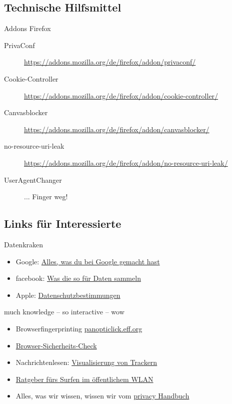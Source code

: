 \documentclass[hyperref={colorlinks,linkcolor=blue}, utf8]{beamer}
\begin{document}
	\subsection{Technische Hilfsmittel}
	\begin{frame}{Addons Firefox}
		\noindent
		\begin{description}
			\item[PrivaConf] \url{https://addons.mozilla.org/de/firefox/addon/privaconf/}
			\item[Cookie-Controller] \url{https://addons.mozilla.org/de/firefox/addon/cookie-controller/}
			\item[Canvasblocker] \url{https://addons.mozilla.org/de/firefox/addon/canvasblocker/}
			\item[no-resource-uri-leak] \url{https://addons.mozilla.org/de/firefox/addon/no-resource-uri-leak/}
			\item[UserAgentChanger]{... Finger weg!}
		\end{description}
	\end{frame}
	
	\subsection{Links für Interessierte}
	\begin{frame}{Datenkraken}
			\noindent
			\begin{itemize}
				\item Google: \href{https://myactivity.google.com/}{Alles, was du bei Google gemacht hast}
				\item facebook: \href{https://netzpolitik.org/2016/98-daten-die-facebook-ueber-dich-weiss-und-nutzt-um-werbung-auf-dich-zuzuschneiden/}{Was die so für Daten sammeln}
				\item Apple: \href{https://www.apple.com/privacy/privacy-policy/}{Datenschutzbestimmungen}
			\end{itemize}
	\end{frame}
	
		\begin{frame}{much knowledge -- so interactive -- wow}
			\noindent
			\begin{itemize}
				\item Browserfingerprinting \href{https://panopticlick.eff.org}{panopticlick.eff.org}
				\item \href{https://sec.hpi.de/vulndb/sd_first/}{Browser-Sicherheits-Check}
				\item Nachrichtenlesen: \href{https://trackography.org/}{Visualisierung von Trackern}
				\item \href{https://www.mbem.nrw/unterwegs-im-oeffentlichen-wlan-aber-gut-geschuetzt}{Ratgeber fürs Surfen im öffentlichem WLAN }
				\item Alles, was wir wissen, wissen wir vom \href{https://privacy-handbuch.de/}{privacy Handbuch}
			\end{itemize}
		\end{frame}
	
\end{document}

